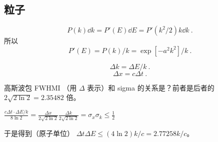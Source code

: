 
\subsection{粒子}
\begin{equation}
P(k)\dd{k} = P'(E)\dd{E} = P'(k^2/2)k\dd{k}~.
\end{equation}
所以
\begin{equation}
P'(E) = P(k)/k = \exp[-a^2 k^2]/k~.
\end{equation}

\begin{equation}
\Delta k = \Delta E/k~.
\end{equation}
\begin{equation}
\Delta x = c\Delta t~.
\end{equation}


高斯波包 FWHMI （用 $\Delta$ 表示）和 sigma 的关系是？前者是后者的 $2\sqrt{2\ln 2} = 2.35482$ 倍。

$\frac{c\Delta t \cdot \Delta E/k}{8\ln 2} = \frac{\Delta x}{2\sqrt{2\ln 2}}\frac{\Delta k}{2\sqrt{2\ln 2}} = \sigma_x \sigma_k \leq \frac{1}{2}$

于是得到（原子单位） $\Delta t\Delta E \leq (4\ln 2)k/c = 2.77258 k/c$。
